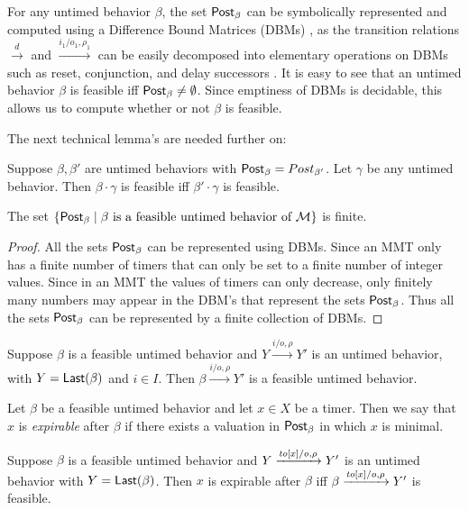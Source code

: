 For any untimed behavior $\beta$, the set $\mathsf{Post}_{\beta}$ can be symbolically represented and computed using a Difference Bound Matrices (DBMs)
 \cite{Di89},  as the transition relations $\xrightarrow{d}$ and $\xrightarrow{i_1/o_1, \rho_1}$ can be easily decomposed 
into elementary operations on DBMs such as reset, conjunction, and delay successors \cite{BengtssonY03}.
%
It is easy to see that an untimed behavior $\beta$ is feasible iff $\mathsf{Post}_{\beta} \neq \emptyset$.
Since emptiness of DBMs is decidable, this allows us to compute whether or not $\beta$ is feasible.

\iflong
The next technical lemma's are needed further on:

\begin{lemma}
\label{lemma: feasibility concatenation}
Suppose $\beta, \beta'$ are untimed behaviors with
$\mathsf{Post}_{\beta} = Post_{\beta'}$. Let $\gamma$ be any untimed behavior.
Then $\beta \cdot \gamma$ is feasible iff $\beta' \cdot \gamma$ is feasible.
\end{lemma}

\begin{lemma}
\label{lemma finitely many zones}
The set
$\{ \mathsf{Post}_{\beta} \mid \beta \mbox{ is a feasible untimed behavior of } {\cal M} \}$ is finite.
\end{lemma}

\begin{proof}
All the sets $\mathsf{Post}_{\beta}$ can be represented using DBMs. Since an MMT only has a finite number of timers that can only be set to a finite number of integer values. Since in an MMT the values of timers can only decrease, only finitely many numbers may
appear in the DBM's that represent the sets $\mathsf{Post}_{\beta}$. Thus all the sets $\mathsf{Post}_{\beta}$ can be represented by a finite
collection of DBMs.
\end{proof}

\begin{lemma}
Suppose $\beta$ is a feasible untimed behavior and $Y \xrightarrow{i/o, \rho} Y'$ is an untimed behavior,
with $Y = \mathsf{Last}({\beta})$ and $i \in I$.
Then $\beta \xrightarrow{i/o, \rho} Y'$ is a feasible untimed behavior.
\end{lemma}

Let $\beta$ be a feasible untimed behavior and let $x \in X$ be a timer. Then we say that $x$ is \emph{expirable} after $\beta$
if there exists a valuation in $\mathsf{Post}_{\beta}$ in which $x$ is minimal.

\begin{lemma}
Suppose $\beta$ is a feasible untimed behavior and $Y \xrightarrow{\mathit{to}[x]/o, \rho} Y'$ is an untimed behavior 
with $Y = \mathsf{Last}({\beta})$.
Then $x$ is expirable after $\beta$ iff $\beta \xrightarrow{\mathit{to}[x]/o, \rho} Y'$ is feasible.
\end{lemma}

